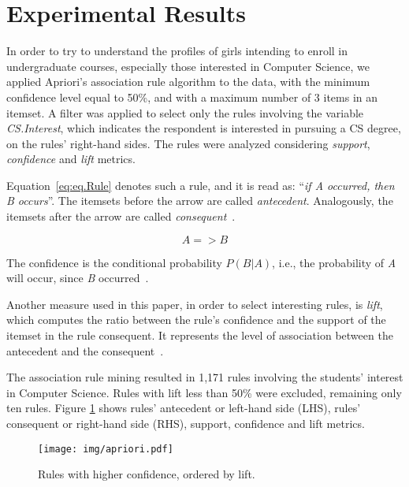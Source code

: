 \section{Experimental Results}\label{sec:results}%
In order to try to understand the profiles of girls intending to enroll in undergraduate courses, especially those interested in Computer Science, we applied Apriori's association rule algorithm to the data, with the minimum confidence level equal to 50\%, and with a maximum number of 3 items in an itemset. A filter was applied to select only the rules involving the variable \emph{CS.Interest}, which indicates the respondent is interested in pursuing a CS degree, on the rules' right-hand sides. The rules were analyzed considering \emph{support}, \emph{confidence} and \emph{lift} metrics.





Equation~\ref{eq:eq.Rule} denotes such a rule, and it is read as: ``\emph{if A occurred, then B occurs}''. The itemsets before the arrow are called \emph{antecedent}. Analogously, the itemsets after the arrow are called \emph{consequent}~\cite{Hastie2009}.

\begin{equation}
{A} => {B}
\label{eq:eq.Rule}%
\end{equation}

The confidence is the conditional probability $P(B|A)$, i.e., the probability of \emph{A} will occur, since \emph{B} occurred~\cite{Hastie2009}.

Another measure used in this paper, in order to select interesting rules, is \emph{lift}, which computes the ratio between the rule's confidence and the support of the itemset in the rule consequent. It represents the level of association between the antecedent and the consequent~\cite{tan2006introduction}.







The association rule mining resulted in 1,171 rules involving the students' interest in Computer Science. Rules with lift less than 50\% were excluded, remaining only ten rules. Figure \ref{fig:apriori} shows rules' antecedent or left-hand side (LHS), rules' consequent or right-hand side (RHS), support, confidence and lift metrics.

\begin{figure}%
\texttt{[image: img/apriori.pdf]}%
\caption{Rules with higher confidence, ordered by lift.}%
\label{fig:apriori}%
\end{figure}%

